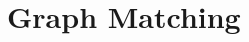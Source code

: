 \documentclass[10pt,journal,cspaper,compsoc]{IEEEtran}
\begin{document}
% 
% 
% 
% 
% 
% 
% 

\section{Graph Matching} %
\label{sec:graph_matching}
\end{document}
